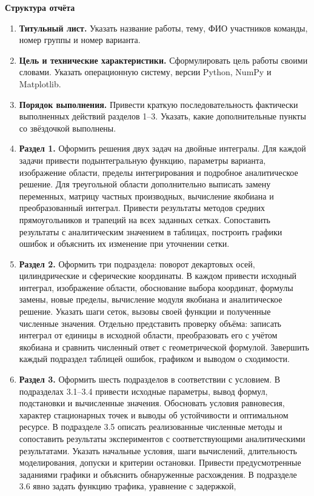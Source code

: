 \documentclass[12pt,a4paper]{article}
\newcommand{\taskhead}[1]{\par\textbf{#1}\par}
\begin{document}
\taskhead{Структура отчёта}
\begin{enumerate}
\item \textbf{Титульный лист.} Указать название работы, тему,
ФИО участников команды, номер группы и номер варианта.
\item \textbf{Цель и технические характеристики.} Сформулировать цель работы
своими словами. Указать операционную систему, версии Python, NumPy и Matplotlib.
\item \textbf{Порядок выполнения.} Привести краткую последовательность
фактически выполненных действий разделов 1--3. Указать, какие дополнительные
пункты со звёздочкой выполнены.
\item \textbf{Раздел 1.} Оформить решения двух задач на двойные интегралы.
Для каждой задачи привести подынтегральную функцию, параметры варианта,
изображение области, пределы интегрирования и подробное аналитическое решение.
Для треугольной области дополнительно выписать замену переменных,
матрицу частных производных, вычисление якобиана и преобразованный интеграл.
Привести результаты методов средних прямоугольников и трапеций на всех
заданных сетках. Сопоставить результаты с аналитическим значением в таблицах,
построить графики ошибок и объяснить их изменение при уточнении сетки.
\item \textbf{Раздел 2.} Оформить три подраздела: поворот декартовых осей,
цилиндрические и сферические координаты. В каждом привести исходный интеграл,
изображение области, обоснование выбора координат, формулы замены,
новые пределы, вычисление модуля якобиана и аналитическое решение.
Указать шаги сеток, вызовы своей функции и полученные численные значения.
Отдельно представить проверку объёма: записать интеграл от единицы
в исходной области, преобразовать его с учётом якобиана и сравнить
численный ответ с геометрической формулой. Завершить каждый подраздел
таблицей ошибок, графиком и выводом о сходимости.
\item \textbf{Раздел 3.} Оформить шесть подразделов в соответствии с условием.
В подразделах 3.1--3.4 привести исходные параметры, вывод формул,
подстановки и вычисленные значения. Обосновать условия равновесия,
характер стационарных точек и выводы об устойчивости и оптимальном ресурсе.
В подразделе 3.5 описать реализованные численные методы и сопоставить
результаты экспериментов с соответствующими аналитическими результатами.
Указать начальные условия, шаги вычислений, длительность моделирования,
допуски и критерии остановки. Привести предусмотренные заданиями графики
и объяснить обнаруженные расхождения.
В подразделе 3.6 явно задать функцию трафика, уравнение с задержкой,

\end{enumerate}
\end{document}

